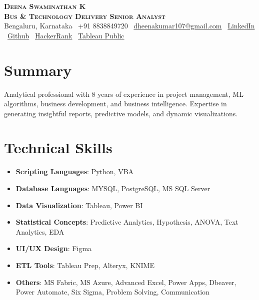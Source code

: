 \documentclass[letterpaper,11pt]{article}
\begin{document}



\begin{center}
    \textbf{\Huge \scshape Deena Swaminathan K} \\ \vspace{8pt}
    \textbf{\Large \scshape Bus \& Technology Delivery Senior Analyst} \\ \vspace{4pt}
    \small Bengaluru, Karnataka \textbar\ 
    \small +91 8838849720 \textbar\ 
    \href{mailto:dheenakumar107@gmail.com}{{\small dheenakumar107@gmail.com}} \textbar\ 
    \href{https://www.linkedin.com/in/deena-swaminathan-k-0893179a/}{{\small LinkedIn}} \textbar\ 
    \href{https://github.com/DeenaSwaminathanKumaravel}{{\small Github}} \textbar\ 
    \href{https://www.hackerrank.com/profile/dheenakumar107}{{\small HackerRank}} \textbar\ 
    \href{https://public.tableau.com/app/profile/deena6901/vizzes}{{\small Tableau Public}}
\end{center}

\section{Summary}
    \begin{itemize}[leftmargin=0.15in, label={}]
	\small{\item{Analytical professional with 8 years of experience in project management, ML algorithms, business development, and business intelligence. Expertise in generating insightful reports, predictive models, and dynamic visualizations.}}
    \end{itemize}


\section{Technical Skills}
\begin{itemize}[leftmargin=0.35in, label=\textbullet, itemsep=0.0em]
    \item \small \textbf{Scripting Languages}: Python, VBA
    \item \small \textbf{Database Languages}: MYSQL, PostgreSQL, MS SQL Server
    \item \small \textbf{Data Visualization}: Tableau, Power BI
    \item \small \textbf{Statistical Concepts}: Predictive Analytics, Hypothesis, ANOVA, Text Analytics, EDA
    \item \small \textbf{UI/UX Design}: Figma
    \item \small \textbf{ETL Tools}: Tableau Prep, Alteryx, KNIME
    \item \small \textbf{Others}: MS Fabric, MS Azure, Advanced Excel, Power Apps, Dbeaver, Power Automate, Six Sigma, Problem Solving, Communication
\end{itemize}
\end{document}
